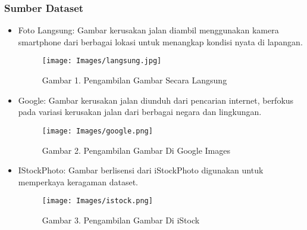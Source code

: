 \documentclass[12pt,a4paper]{article}
\begin{document}
\subsubsection{Sumber Dataset}
\begin{itemize}
    \item Foto Langsung: Gambar kerusakan jalan diambil menggunakan kamera smartphone dari berbagai lokasi untuk menangkap kondisi nyata di lapangan.
    \begin{figure}[h]
        \centering
        \texttt{[image: Images/langsung.jpg]}
        \caption*{Gambar 1. Pengambilan Gambar Secara Langsung}
        \label{fig:enter-label}
    \end{figure}
    \item Google: Gambar kerusakan jalan diunduh dari pencarian internet, berfokus pada variasi kerusakan jalan dari berbagai negara dan lingkungan.
    \begin{figure}[h]
        \centering
        \texttt{[image: Images/google.png]}
        \caption*{Gambar 2. Pengambilan Gambar Di Google Images}
        \label{fig:enter-label}
    \end{figure}
    \item IStockPhoto: Gambar berlisensi dari iStockPhoto digunakan untuk memperkaya keragaman dataset.
    \begin{figure}[h]
        \centering
        \texttt{[image: Images/istock.png]}
        \caption*{Gambar 3. Pengambilan Gambar Di iStock}
        \label{fig:enter-label}
    \end{figure}
\end{itemize}
\end{document}
